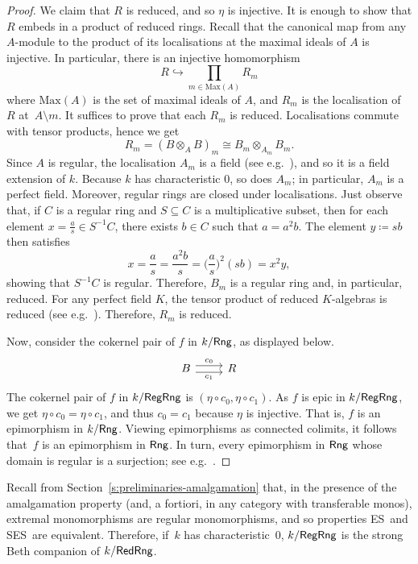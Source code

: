\documentclass[a4paper,10pt,reqno]{amsart}
\theoremstyle{definition}
\theoremstyle{remark}
\newcommand{\Rng}{{\sf Rng}}								%
\newcommand{\RegRng}{{\sf RegRng}}						%
\newcommand{\RedRng}{{\sf RedRng}}						%
\newcommand{\into}{\hookrightarrow}						%
\newcommand{\ES}{\textnormal{ES}}
\newcommand{\SES}{\textnormal{SES}}
\begin{document}
\begin{proof}
We claim that $R$ is reduced, and so $\eta$ is injective. It is enough to show that $R$ embeds in a product of reduced rings. Recall that the canonical map from any $A$-module to the product of its localisations at the maximal ideals of $A$ is injective. In particular, there is an injective homomorphism
\[
R \into \prod_{m\in \mathrm{Max}(A)}{R_{m}}
\] 
where $\mathrm{Max}(A)$ is the set of maximal ideals of $A$, and $R_{m}$ is the localisation of $R$ at~$A\setminus m$. It suffices to prove that each $R_{m}$ is reduced. Localisations commute with tensor products, hence we get
\[
R_{m} = (B\otimes_{A} B)_{m} \cong B_{m} \otimes_{A_{m}} B_{m}.
\]
Since $A$ is regular, the localisation $A_{m}$ is a field (see e.g.\ \cite[Theorem~1.16]{Goodearl1991}), and so it is a field extension of $k$. Because $k$ has characteristic $0$, so does $A_{m}$; in particular, $A_{m}$ is a perfect field.
%
Moreover, regular rings are closed under localisations. Just observe that, if $C$ is a regular ring and $S\subseteq C$ is a multiplicative subset, then for each element $x=\frac{a}{s}\in S^{-1}C$, there exists $b\in C$ such that $a=a^{2}b$. The element $y\coloneqq sb$ then satisfies
\[
x = \frac{a}{s} = \frac{a^{2}b}{s} = \bigg(\frac{a}{s}\bigg)^{2} (sb) = x^{2} y,
\]
showing that $S^{-1}C$ is regular. Therefore, $B_{m}$ is a regular ring and, in particular, reduced. For any perfect field $K$, the tensor product of reduced $K$-algebras is reduced (see e.g.\ \cite[Ch.~V, \S 15, Th\'eor\`eme~3]{BourbakiAlgebra4-7}). Therefore, $R_{m}$ is reduced. 

Now, consider the cokernel pair of $f$ in $k/\Rng$, as displayed below.
\[\begin{tikzcd}
B \arrow[yshift=3pt]{r}{c_{0}} \arrow[yshift=-3pt]{r}[swap]{c_{1}} & R
\end{tikzcd}\]
The cokernel pair of $f$ in $k/\RegRng$ is $(\eta\circ c_{0},\eta\circ c_{1})$. As $f$ is epic in $k/\RegRng$, we get $\eta\circ c_{0} = \eta\circ c_{1}$, and thus $c_{0}=c_{1}$ because $\eta$ is injective. That is, $f$ is an epimorphism in $k/\Rng$. Viewing epimorphisms as connected colimits, it follows that~$f$ is an epimorphism in $\Rng$. In turn, every epimorphism in $\Rng$ whose domain is regular is a surjection; see e.g.\ \cite[Theorems~2.1 and~3.12]{Tarizadeh2022}.
\end{proof}

Recall from Section~\ref{s:preliminaries-amalgamation} that, in the presence of the amalgamation property (and, a fortiori, in any category with transferable monos), extremal monomorphisms are regular monomorphisms, and so properties \ES~and \SES~are equivalent. Therefore, if~$k$ has characteristic~$0$, $k/\RegRng$ is the strong Beth companion of $k/\RedRng$.
\end{document}
